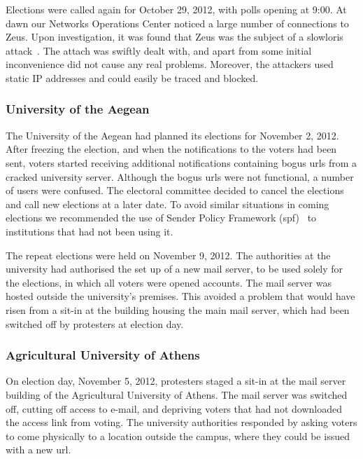 \documentclass[letterpaper,10pt]{article}
\begin{document}
Elections were called again for October 29, 2012, with polls opening
at 9:00. At dawn our Networks Operations Center noticed a large number
of connections to Zeus. Upon investigation, it was found that Zeus was
the subject of a slowloris attack~\cite{slowloris}. The attach was
swiftly dealt with, and apart from some initial inconvenience did not
cause any real problems. Moreover, the attackers used static IP
addresses and could easily be traced and blocked.

\subsubsection{University of the Aegean}

The University of the Aegean had planned its elections for November 2,
2012. After freezing the election, and when the notifications to the
voters had been sent, voters started receiving additional
notifications containing bogus {\sc url}s from a cracked university server.
Although the bogus {\sc url}s were not functional, a number of users were
confused. The electoral committee decided to cancel the elections and
call new elections at a later date. To avoid similar situations in
coming elections we recommended the use of Sender Policy Framework
({\sc spf})~\cite{rfc4408} to institutions that had not been using it.

The repeat elections were held on November 9, 2012. The authorities at
the university had authorised the set up of a new mail server, to be
used solely for the elections, in which all voters were opened
accounts. The mail server was hosted outside the university's
premises. This avoided a problem that would have risen from a sit-in
at the building housing the main mail server, which had been switched
off by protesters at election day.

\subsubsection{Agricultural University of Athens}

On election day, November 5, 2012, protesters staged a sit-in at the
mail server building of the Agricultural University of Athens. The
mail server was switched off, cutting off access to e-mail, and
depriving voters that had not downloaded the access link from voting.
The university authorities responded by asking voters to come
physically to a location outside the campus, where they could be
issued with a new {\sc url}.
\end{document}
